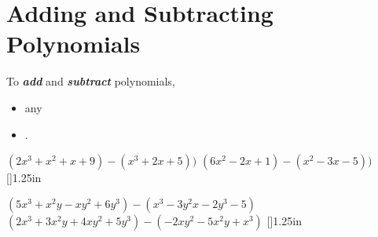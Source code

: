 \section{Adding and Subtracting Polynomials}

To {\bfseries\itshape add} and {\bfseries\itshape subtract} polynomials,
\begin{itemize}
    \item {} any 
    \item {}  .
\end{itemize}


\myProblems
    {
        $ (2x^3 + x^2 + x + 9) - (x^3 + 2x + 5)) $
    }
    {
        $ (6x^2 - 2x + 1) - (x^2 - 3x - 5)) $
    }
    [\normalsize]{1.25in}


\myProblems
    {
        $(5x^3+x^2y-xy^2+6y^3)  -  (x^3-3y^2x-2y^3 - 5)$
    }
    {
        $(2x^3+3x^2y+4xy^2+5y^3)  -  (-2xy^2-5x^2y+x^3)$
    }
[\normalsize]{1.25in}

